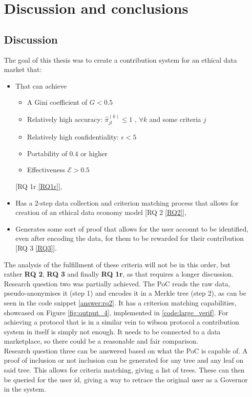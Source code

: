 \documentclass[english, 12pt, a4paper, sci, utf8, a-2b, online]{aaltothesis}
\theoremstyle{change}
\theoremstyle{theoremstyle}
\begin{document}
\clearpage

\section{Discussion and conclusions}
\label{sec:summary}
\subsection{Discussion}
The goal of this thesis was to create a contribution system for an ethical data market that:
\begin{itemize}
    \item That can achieve 
    \begin{itemize}
        \item A Gini coefficient of $G < 0.5$
        \item Relatively high accuracy: $\hat{\pi}^{(k)}_{jl} \leq 1 \text{ , } \forall k$ and some criteria $j$
        \item Relatively high confidentiality: $\epsilon < 5$
        \item Portability of $0.4$ or higher
        \item Effectiveness $\mathcal{E} > 0.5$
    \end{itemize} [RQ 1r \ref{RQ1r}], 
    \item Has a 2-step data collection and criterion matching process that allows for creation of an ethical data economy model [RQ 2 \ref{RQ2}],
    \item Generates some sort of proof that allows for the user account to be identified, even after encoding the data, for them to be rewarded for their contribution [RQ 3 \ref{RQ3}].
\end{itemize}
The analysis of the fulfillment of these criteria will not be in this order, but rather \textbf{RQ 2}, \textbf{RQ 3} and finally \textbf{RQ 1r}, as that requires a longer discussion.\\
Research question two was partially achieved. The PoC reads the raw data, pseudo-anonymises it (step 1) and encodes it in a Merkle tree (step 2), as can be seen in the code snippet \ref{answer:rq2}. It has a criterion matching capabilities, showcased on Figure \ref{fig:output_4}, implemented in \ref{code:large_verif}. For achieving a protocol that is in a similar vein to wibson protocol a contribution system in itself is simply not enough. It needs to be connected to a data marketplace, so there could be a reasonable and fair comparison.\\
Research question three can be answered based on what the PoC is capable of. A proof of inclusion or not inclusion can be generated for any tree and any leaf on said tree. This allows for criteria matching, giving a list of trees. These can then be queried for the user id, giving a way to retrace the original user as a Governor in the system.\\
\end{document}
